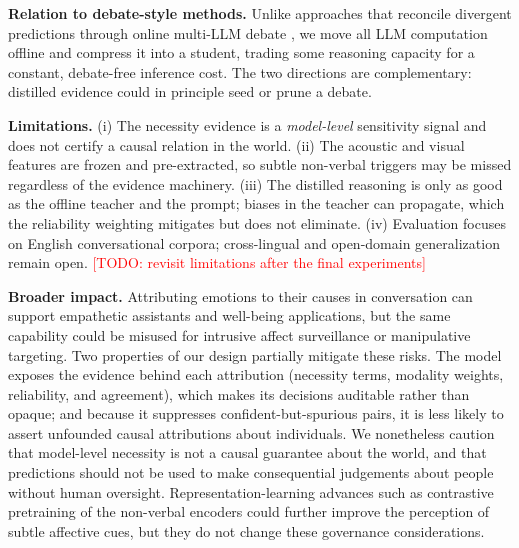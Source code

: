 \documentclass[journal]{IEEEtran}
\newcommand{\todo}[1]{\textcolor{red}{[TODO: #1]}}
\begin{document}
\noindent\textbf{Relation to debate-style methods.} Unlike approaches that reconcile divergent
predictions through online multi-LLM debate \cite{wu2025decdebate}, we move all LLM computation
offline and compress it into a student, trading some reasoning capacity for a constant,
debate-free inference cost. The two directions are complementary: distilled evidence could in
principle seed or prune a debate.

\noindent\textbf{Limitations.} (i) The necessity evidence is a \emph{model-level} sensitivity
signal and does not certify a causal relation in the world. (ii) The acoustic and visual
features are frozen and pre-extracted, so subtle non-verbal triggers may be missed regardless of
the evidence machinery. (iii) The distilled reasoning is only as good as the offline teacher and
the prompt; biases in the teacher can propagate, which the reliability weighting mitigates but
does not eliminate. (iv) Evaluation focuses on English conversational corpora; cross-lingual and
open-domain generalization remain open. \todo{revisit limitations after the final experiments}

\noindent\textbf{Broader impact.} Attributing emotions to their causes in conversation can
support empathetic assistants and well-being applications, but the same capability could be
misused for intrusive affect surveillance or manipulative targeting. Two properties of our
design partially mitigate these risks. The model exposes the evidence behind each attribution
(necessity terms, modality weights, reliability, and agreement), which makes its decisions
auditable rather than opaque; and because it suppresses confident-but-spurious pairs, it is
less likely to assert unfounded causal attributions about individuals. We nonetheless caution
that model-level necessity is not a causal guarantee about the world, and that predictions
should not be used to make consequential judgements about people without human oversight.
Representation-learning advances such as contrastive pretraining of the non-verbal encoders
\cite{chen2020simclr} could further improve the perception of subtle affective cues, but they
do not change these governance considerations.

\end{document}
